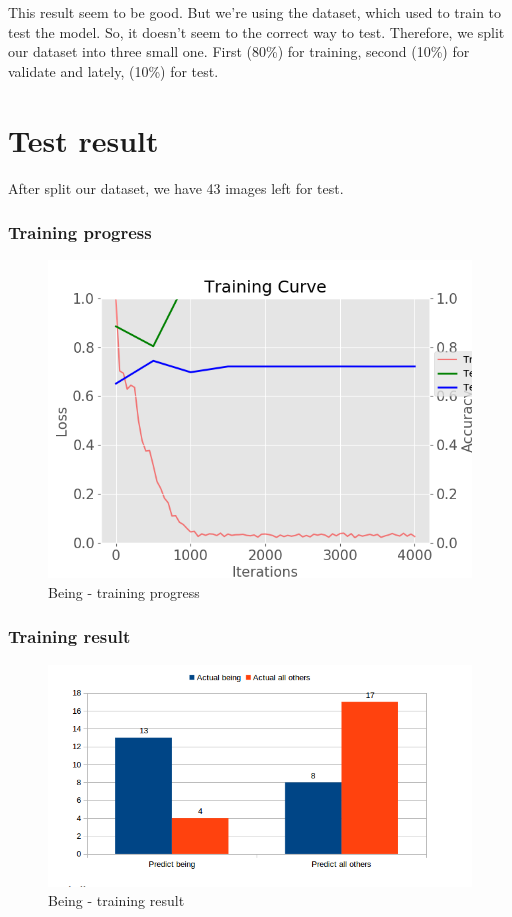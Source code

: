 \documentclass[11pt]{article}
\begin{document}
This result seem to be good. But we're using the dataset, which used to train to test the model. So, it doesn't seem to the correct way to test. Therefore, we split our dataset into three small one. First (80\%) for training, second (10\%) for validate and lately, (10\%) for test.

\section{Test result}

After split our dataset, we have 43 images left for test.

\subsubsection{Training progress}

\begin{figure}[H]
\centering
\includegraphics[width=1\textwidth]{images/only_being_43_images}
\caption{Being - training progress}
\end{figure}

\subsubsection{Training result}

\begin{figure}[H]
\centering
\includegraphics[width=1\textwidth]{images/test_43_image_result}
\caption{Being - training result}
\end{figure}
\end{document}
